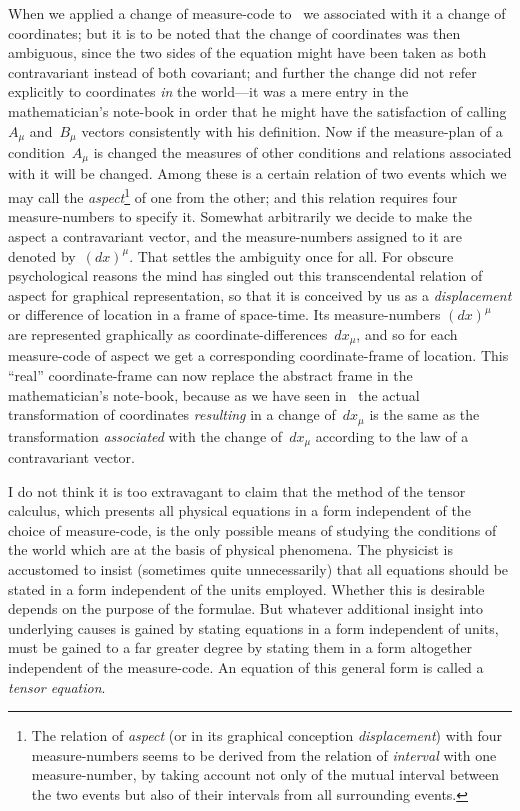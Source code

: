 \documentclass[12pt]{book}
\begin{document}
When we applied a change of measure\hyp{}code to~ we associated with
it a change of coordinates; but it is to be noted that the change of coordinates
%
was then ambiguous, since the two sides of the equation might have been
taken as both contravariant instead of both covariant; and further the change
did not refer explicitly to coordinates \emph{in} the world---it was a mere entry in
the mathematician's note-book in order that he might have the satisfaction
of calling $A_{\mu}$ and~$B_{\mu}$ vectors consistently with his definition. Now if the
measure\hyp{}plan of a condition~$A_{\mu}$ is changed the measures of other conditions
and relations associated with it will be changed. Among these is a certain
relation of two events which we may call the \emph{aspect}\footnote
  {The relation of \emph{aspect} (or in its graphical conception \emph{displacement}) with four measure\hyp{}numbers
%
%
  seems to be derived from the relation of \emph{interval} with one measure\hyp{}number, by taking
  account not only of the mutual interval between the two events but also of their intervals from
  all surrounding events.}
of one from the other;
and this relation requires four measure\hyp{}numbers to specify it. Somewhat
arbitrarily we decide to make the aspect a contravariant vector, and the
measure\hyp{}numbers assigned to it are denoted by~$(dx)^{\mu}$. That settles the ambiguity
once for all. For obscure psychological reasons the mind has singled
out this transcendental relation of aspect for graphical representation, so that
it is conceived by us as a \emph{displacement} or difference of location in a frame of
space-time. Its measure\hyp{}numbers $(dx)^{\mu}$ are represented graphically as coordinate\hyp{}differences~$dx_{\mu}$,
and so for each measure\hyp{}code of aspect we get a corresponding
coordinate\hyp{}frame of location. This ``real'' coordinate\hyp{}frame can now
replace the abstract frame in the mathematician's note-book, because as we
have seen in~ the actual transformation of coordinates \emph{resulting} in a
change of~$dx_{\mu}$ is the same as the transformation \emph{associated} with the change of~$dx_{\mu}$
according to the law of a contravariant vector.

I do not think it is too extravagant to claim that the method of the tensor
%
calculus, which presents all physical equations in a form independent of the
choice of measure\hyp{}code, is the only possible means of studying the conditions
of the world which are at the basis of physical phenomena. The physicist is
accustomed to insist (sometimes quite unnecessarily) that all equations should
be stated in a form independent of the units employed. Whether this is
desirable depends on the purpose of the formulae. But whatever additional
insight into underlying causes is gained by stating equations in a form independent
of units, must be gained to a far greater degree by stating them in
a form altogether independent of the measure\hyp{}code. An equation of this
general form is called a \emph{tensor equation}.
\end{document}
